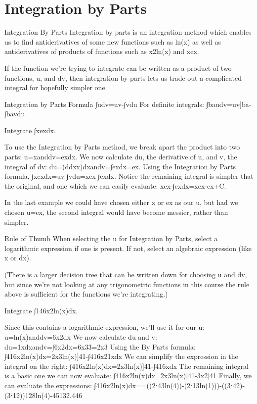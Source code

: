 \section{Integration by Parts}
\label{sec:integration-by-parts}
Integration By Parts
Integration by parts is an integration method which enables us to find antiderivatives of some new functions such as ln(x) as well as antiderivatives of products of functions such as x2ln(x) and xex.

If the function we're trying to integrate can be written as a product of two functions, u, and dv, then integration by parts lets us trade out a complicated integral for hopefully simpler one.

Integration by Parts Formula
∫udv=uv-∫vdu
For definite integrals:
∫baudv=uv]ba-∫bavdu
\begin{example}
Integrate ∫xexdx.

\begin{solution}
To use the Integration by Parts method, we break apart the product into two parts:
u=xanddv=exdx.
We now calculate du, the derivative of u, and v, the integral of dv:
du=(ddxx)dxandv=∫exdx=ex.
Using the Integration by Parts formula,
∫xexdx=uv-∫vdu=xex-∫exdx.
Notice the remaining integral is simpler that the original, and one which we can easily evaluate:
xex-∫exdx=xex-ex+C.
\end{solution}\end{example}

In the last example we could have chosen either x or ex as our u, but had we chosen u=ex, the second integral would have become messier, rather than simpler.

Rule of Thumb
When selecting the u for Integration by Parts, select a logarithmic expression if one is present. If not, select an algebraic expression (like x or dx).

(There is a larger decision tree that can be written down for choosing u and dv, but since we're not looking at any trigonometric functions in this course the rule above is sufficient for the functions we're integrating.)

\begin{example}
Integrate ∫146x2ln(x)dx.

\begin{solution}
Since this contains a logarithmic expression, we'll use it for our u:
u=ln(x)anddv=6x2dx
We now calculate du and v:
du=1xdxandv=∫6x2dx=6x33=2x3
Using the By Parts formula:
∫416x2ln(x)dx=2x3ln(x)]41-∫416x21xdx
We can simplify the expression in the integral on the right:
∫416x2ln(x)dx=2x3ln(x)]41-∫416xdx
The remaining integral is a basic one we can now evaluate:
∫416x2ln(x)dx=2x3ln(x)]41-3x2]41
Finally, we can evaluate the expressions:
∫416x2ln(x)dx==\approx   ((2⋅43ln(4))-(2⋅13ln(1)))-((3⋅42)-(3⋅12))128ln(4)-45132.446
\end{solution}\end{example}
